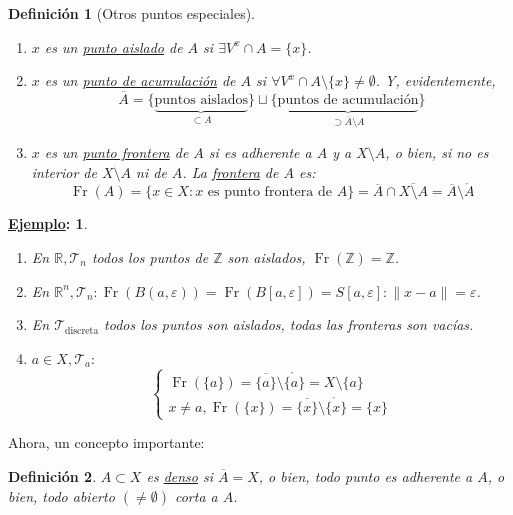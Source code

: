 \documentclass[10pt,a4paper,openright]{book}
\theoremstyle{break}
\newtheorem*{defi}{Definición}
\newtheorem*{ej}{\underline{Ejemplo}:}
\DeclareMathOperator{\fr}{Fr}
\begin{document}
\begin{defi}[Otros puntos especiales]    
\begin{enumerate}
    \item $x$ es un \underline{punto aislado} de $A$ si $\exists V^x \cap A = \{x\}$.
    \item $x$ es un \underline{punto de acumulación} de $A$ si $\forall V^x \cap A \setminus \{x\} \neq \emptyset$. Y, evidentemente,
    \[
    \overline{A} = \{\underbrace{\text{puntos aislados}}_{\subset A}\} \sqcup \{\underbrace{\text{puntos de acumulación}}_{\supset \overline{A} \setminus A}\} 
    \]
    \item $x$ es un \underline{punto frontera} de $A$ si es adherente a $A$ y a $X \setminus A$, o bien, si no es interior de $X \setminus A$ ni de $A$. La \underline{frontera} de $A$ es: 
    \[
    \fr\left( A \right) = \{x \in X: x \text{ es punto frontera de } A\} = \overline{A} \cap \overline{X \setminus A} = \overline{A} \setminus \mathring{A}     
    \]
\end{enumerate}
\end{defi}

\begin{ej}
\begin{enumerate}
    \item En $\mathbb{R}, \mathcal{T}_n$ todos los puntos de $\mathbb{Z}$ son aislados, $\fr\left( \mathbb{Z} \right) = \mathbb{Z}$.
    \item En $\mathbb{R}^n, \mathcal{T}_n: \fr\left( B\left( a, \varepsilon \right) \right) = \fr\left( B\left[ a, \varepsilon \right] \right) = S\left[ a, \varepsilon \right] : \lVert x - a \rVert = \varepsilon$.
    \item En $\mathcal{T}_{\text{discreta}}$ todos los puntos son aislados, todas las fronteras son vacías.
    \item $a \in X, \mathcal{T}_a: $
    \[
    \begin{cases}
        \fr\left( \{a\} \right) = \overline{\{a\}} \setminus \mathring{\{a\}} = X \setminus \{a\}\\
        x \neq a, \fr\left( \{x\} \right) = \overline{\{x\}} \setminus \mathring{\{x\}} = \{x\} 
    \end{cases} 
    \]
\end{enumerate}
\end{ej}

Ahora, un concepto importante:
\begin{defi}
$A \subset X$ es \underline{denso} si $\overline{A} = X$, o bien, todo punto es adherente a $A$, o bien, todo abierto $\left( \neq \emptyset \right)$ corta a $A$.
\end{defi}
\end{document}
